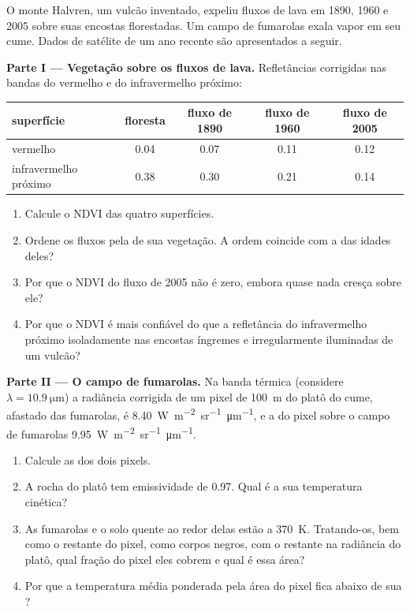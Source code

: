 \begin{problem}
\label{pb:b3:remote-sensing-gis:1}
O monte Halvren, um vulcão inventado, expeliu fluxos de lava em 1890, 1960
e 2005 sobre suas encostas florestadas. Um campo de fumarolas exala vapor em seu cume.
Dados de satélite de um ano recente são apresentados a seguir.

\medskip\noindent\textbf{Parte I --- Vegetação sobre os fluxos de lava.} Refletâncias corrigidas
nas bandas do vermelho e do infravermelho próximo:
\begin{center}
\small
\begin{tabular}{lcccc}
\hline
superfície & floresta & fluxo de 1890 & fluxo de 1960 & fluxo de 2005 \\
\hline
vermelho & 0.04 & 0.07 & 0.11 & 0.12 \\
infravermelho próximo & 0.38 & 0.30 & 0.21 & 0.14 \\
\hline
\end{tabular}
\end{center}
\begin{enumerate}
\item Calcule o NDVI das quatro superfícies.
\item Ordene os fluxos pela  de sua vegetação. A
  ordem coincide com a das idades deles?
\item Por que o NDVI do fluxo de 2005 não é zero, embora quase
  nada cresça sobre ele?
\item Por que o NDVI é mais confiável do que a refletância do infravermelho próximo
  isoladamente nas encostas íngremes e irregularmente iluminadas de um vulcão?
\end{enumerate}

\medskip\noindent\textbf{Parte II --- O campo de fumarolas.} Na banda térmica
(considere $\lambda = \qty{10.9}{\micro\metre}$) a radiância corrigida de
um pixel de \qty{100}{m} do platô do cume, afastado das fumarolas, é
\qty{8.40}{W.m^{-2}.sr^{-1}.\micro\metre^{-1}}, e a do pixel sobre
o campo de fumarolas \qty{9.95}{W.m^{-2}.sr^{-1}.\micro\metre^{-1}}.
\begin{enumerate}[resume]
\item Calcule as  dos dois pixels.
\item A rocha do platô tem emissividade de 0.97. Qual é a sua temperatura
  cinética?
\item As fumarolas e o solo quente ao redor delas estão a
  \qty{370}{K}. Tratando-os, bem como o restante do pixel, como corpos negros,
  com o restante na radiância do platô, qual fração do pixel eles cobrem
  e qual é essa área?
\item Por que a temperatura média ponderada pela área do pixel fica abaixo
  de sua ?
\end{enumerate}


\end{problem}
